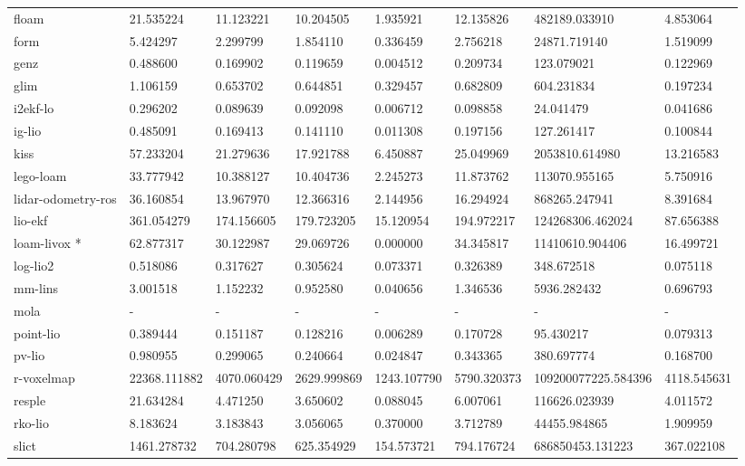 \begin{table}[]
{\begin{tabular}{llllllll}
		floam & 21.535224 & 11.123221 & 10.204505 & 1.935921 & 12.135826 & 482189.033910 & 4.853064 \\
		form & 5.424297 & 2.299799 & 1.854110 & 0.336459 & 2.756218 & 24871.719140 & 1.519099 \\
		genz & 0.488600 & 0.169902 & 0.119659 & 0.004512 & 0.209734 & 123.079021 & 0.122969 \\
		glim & 1.106159 & 0.653702 & 0.644851 & 0.329457 & 0.682809 & 604.231834 & 0.197234 \\
		i2ekf-lo & 0.296202 & 0.089639 & 0.092098 & 0.006712 & 0.098858 & 24.041479 & 0.041686 \\
		ig-lio & 0.485091 & 0.169413 & 0.141110 & 0.011308 & 0.197156 & 127.261417 & 0.100844 \\
		kiss & 57.233204 & 21.279636 & 17.921788 & 6.450887 & 25.049969 & 2053810.614980 & 13.216583 \\
		lego-loam & 33.777942 & 10.388127 & 10.404736 & 2.245273 & 11.873762 & 113070.955165 & 5.750916 \\
		lidar-odometry-ros & 36.160854 & 13.967970 & 12.366316 & 2.144956 & 16.294924 & 868265.247941 & 8.391684 \\
		lio-ekf & 361.054279 & 174.156605 & 179.723205 & 15.120954 & 194.972217 & 124268306.462024 & 87.656388 \\
		loam-livox * & 62.877317 & 30.122987 & 29.069726 & 0.000000 & 34.345817 & 11410610.904406 & 16.499721 \\
		log-lio2 & 0.518086 & 0.317627 & 0.305624 & 0.073371 & 0.326389 & 348.672518 & 0.075118 \\
		mm-lins & 3.001518 & 1.152232 & 0.952580 & 0.040656 & 1.346536 & 5936.282432 & 0.696793 \\
		mola & - & - & - & - & - & - & - \\
		point-lio & 0.389444 & 0.151187 & 0.128216 & 0.006289 & 0.170728 & 95.430217 & 0.079313 \\
		pv-lio & 0.980955 & 0.299065 & 0.240664 & 0.024847 & 0.343365 & 380.697774 & 0.168700 \\
		r-voxelmap & 22368.111882 & 4070.060429 & 2629.999869 & 1243.107790 & 5790.320373 & 109200077225.584396 & 4118.545631 \\
		resple & 21.634284 & 4.471250 & 3.650602 & 0.088045 & 6.007061 & 116626.023939 & 4.011572 \\
		rko-lio & 8.183624 & 3.183843 & 3.056065 & 0.370000 & 3.712789 & 44455.984865 & 1.909959 \\
		slict & 1461.278732 & 704.280798 & 625.354929 & 154.573721 & 794.176724 & 686850453.131223 & 367.022108 \\

\end{tabular}}
\end{table}
